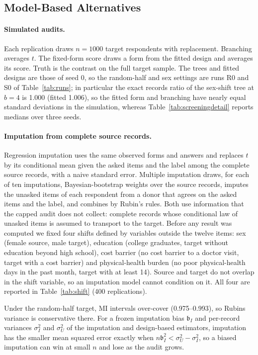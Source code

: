 \subsection{Model-Based Alternatives}\label{app:regimp}\label{app:shift}
\paragraph{Simulated audits.}
Each replication draws $n=1000$ target respondents with replacement. Branching averages $t$. The fixed-form score draws a form from the fitted design and averages its score. Truth is the contrast on the full target sample. The trees and fitted designs are those of seed 0, so the random-half and sex settings are runs R0 and S0 of Table~\ref{tab:runs}; in particular the exact records ratio of the sex-shift tree at $b=4$ is 1.000 (fitted 1.006), so the fitted form and branching have nearly equal standard deviations in the simulation, whereas Table~\ref{tab:screeningdetail} reports medians over three seeds.

\paragraph{Imputation from complete source records.}
Regression imputation uses the same observed forms and answers and replaces $t$ by its conditional mean given the asked items and the label among the complete source records, with a naive standard error. Multiple imputation draws, for each of ten imputations, Bayesian-bootstrap weights over the source records, imputes the unasked items of each respondent from a donor that agrees on the asked items and the label, and combines by Rubin's rules. Both use information that the capped audit does not collect: complete records whose conditional law of unasked items is assumed to transport to the target. Before any result was computed we fixed four shifts defined by variables outside the twelve items: sex (female source, male target), education (college graduates, target without education beyond high school), cost barrier (no cost barrier to a doctor visit, target with a cost barrier) and physical-health burden (no poor physical-health days in the past month, target with at least 14). Source and target do not overlap in the shift variable, so an imputation model cannot condition on it. All four are reported in Table~\ref{tab:shift} (400 replications).


Under the random-half target, MI intervals over-cover (0.975--0.993), so Rubin\textquotesingle s variance is conservative there. For a frozen imputation bias $\mathfrak b_I$ and per-record variances $\sigma_I^2$ and $\sigma_U^2$ of the imputation and design-based estimators, imputation has the smaller mean squared error exactly when $n\mathfrak b_I^2<\sigma_U^2-\sigma_I^2$, so a biased imputation can win at small $n$ and lose as the audit grows.

